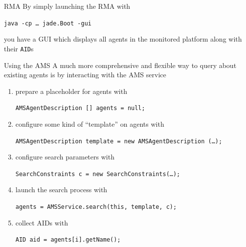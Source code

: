 \documentclass{beamer}\mode<presentation>{\usetheme{AMSCesenaPurpleAndGold}}
\begin{document}
\begin{frame}[c,allowframebreaks]
\begin{block}{\jade{} RMA}
        By simply launching the RMA with
        \begin{center}
            \texttt{java -cp \ldots{} jade.Boot \alert{-gui}}
        \end{center}
        you have a GUI which displays all agents in the monitored \jade{} platform along with their \texttt{AID}s
    \end{block}
    \begin{block}{Using the AMS}
        A much more comprehensive and flexible way to query \jade{} about existing agents is by interacting with the AMS service
        \begin{enumerate}
            \item prepare a placeholder for agents with\\\begin{small}\texttt{\alert{AMSAgentDescription} [] agents = null;}\end{small}
            \item configure some kind of ``template'' on agents with\\\begin{small}\texttt{AMSAgentDescription template = new AMSAgentDescription (\ldots);}\end{small}
            \item configure search parameters with\\\begin{small}\texttt{\alert{SearchConstraints} c = new SearchConstraints(\ldots);}\end{small}
            \item launch the search process with\\\begin{small}\texttt{agents = \alert{AMSService.search}(this, template, c);}\end{small}
            \item collect AIDs with\\\begin{small}\texttt{AID aid = agents[i].\alert{getName()};}\end{small}
        \end{enumerate}
    \end{block}
\end{frame}
\end{document}
